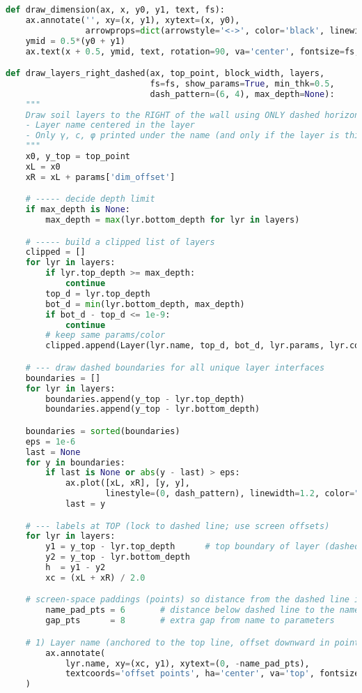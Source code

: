\begin{lstlisting}[language=Python]
def draw_dimension(ax, x, y0, y1, text, fs):
    ax.annotate('', xy=(x, y1), xytext=(x, y0),
                arrowprops=dict(arrowstyle='<->', color='black', linewidth=1.8))
    ymid = 0.5*(y0 + y1)
    ax.text(x + 0.5, ymid, text, rotation=90, va='center', fontsize=fs, color='black')

def draw_layers_right_dashed(ax, top_point, block_width, layers,
                             fs=fs, show_params=True, min_thk=0.5,
                             dash_pattern=(6, 4), max_depth=None):
    """
    Draw soil layers to the RIGHT of the wall using ONLY dashed horizontal lines.
    - Layer name centered in the layer
    - Only γ, c, φ printed under the name (and only if the layer is thick enough)
    """
    x0, y_top = top_point
    xL = x0 
    xR = xL + params['dim_offset']

    # ----- decide depth limit
    if max_depth is None:
        max_depth = max(lyr.bottom_depth for lyr in layers)

    # ----- build a clipped list of layers
    clipped = []
    for lyr in layers:
        if lyr.top_depth >= max_depth:
            continue
        top_d = lyr.top_depth
        bot_d = min(lyr.bottom_depth, max_depth)
        if bot_d - top_d <= 1e-9:
            continue
        # keep same params/color
        clipped.append(Layer(lyr.name, top_d, bot_d, lyr.params, lyr.color))

    # --- draw dashed boundaries for all unique layer interfaces
    boundaries = []
    for lyr in layers:
        boundaries.append(y_top - lyr.top_depth)
        boundaries.append(y_top - lyr.bottom_depth)

    boundaries = sorted(boundaries)
    eps = 1e-6
    last = None
    for y in boundaries:
        if last is None or abs(y - last) > eps:
            ax.plot([xL, xR], [y, y],
                    linestyle=(0, dash_pattern), linewidth=1.2, color="black")
            last = y

    # --- labels at TOP (lock to dashed line; use screen offsets)
    for lyr in layers:
        y1 = y_top - lyr.top_depth      # top boundary of layer (dashed line)
        y2 = y_top - lyr.bottom_depth
        h  = y1 - y2
        xc = (xL + xR) / 2.0

    # screen-space paddings (points) so distance from the dashed line is consistent
        name_pad_pts = 6       # distance below dashed line to the name
        gap_pts      = 8       # extra gap from name to parameters

    # 1) Layer name (anchored to the top line, offset downward in points)
        ax.annotate(
            lyr.name, xy=(xc, y1), xytext=(0, -name_pad_pts),
            textcoords='offset points', ha='center', va='top', fontsize=8, color='black'
    )


\end{lstlisting}
